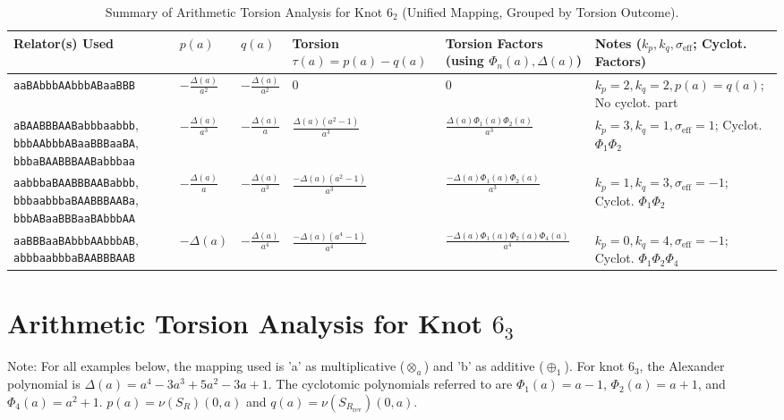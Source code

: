 \documentclass{article}
\begin{document}
\begin{table}[htbp]
\centering
\caption{Summary of Arithmetic Torsion Analysis for Knot $6_2$ (Unified Mapping, Grouped by Torsion Outcome).}
\label{tab:knot62_unified_mapping_new_data}
\scriptsize %
\begin{tabular}{@{}p{3.2cm} p{2.0cm} p{2.0cm} p{2.5cm} p{3.3cm} p{3.3cm}@{}}
\toprule
\textbf{Relator(s) Used} & \textbf{$p(a)$} & \textbf{$q(a)$} & \textbf{Torsion $\tau(a) = p(a) - q(a)$} & \textbf{Torsion Factors} (using $\Phi_n(a), \Delta(a)$) & \textbf{Notes} ($k_p, k_q, \sigma_{\text{eff}}$; Cyclot. Factors) \\
\midrule
\texttt{aaBAbbbAAbbbABaaBBB} & $-\frac{\Delta(a)}{a^2}$ & $-\frac{\Delta(a)}{a^2}$ & $0$ & $0$ & $k_p=2, k_q=2, p(a)=q(a)$; No cyclot. part \\
\addlinespace
\midrule
\texttt{aBAABBBAABabbbaabbb}, \texttt{bbbAAbbbABaaBBBaaBA}, \texttt{bbbaBAABBBAABabbbaa} & $-\frac{\Delta(a)}{a^3}$ & $-\frac{\Delta(a)}{a}$ & $\frac{\Delta(a)(a^2-1)}{a^3}$ & $\frac{\Delta(a)\Phi_1(a)\Phi_2(a)}{a^3}$ & $k_p=3, k_q=1, \sigma_{\text{eff}}=1$; Cyclot. $\Phi_1\Phi_2$ \\
\addlinespace
\midrule
\texttt{aabbbaBAABBBAABabbb}, \texttt{bbbaabbbaBAABBBAABa}, \texttt{bbbABaaBBBaaBAbbbAA} & $-\frac{\Delta(a)}{a}$ & $-\frac{\Delta(a)}{a^3}$ & $\frac{-\Delta(a)(a^2-1)}{a^3}$ & $\frac{-\Delta(a)\Phi_1(a)\Phi_2(a)}{a^3}$ & $k_p=1, k_q=3, \sigma_{\text{eff}}=-1$; Cyclot. $\Phi_1\Phi_2$ \\
\addlinespace
\midrule
\texttt{aaBBBaaBAbbbAAbbbAB}, \texttt{abbbaabbbaBAABBBAAB} & $-\Delta(a)$ & $-\frac{\Delta(a)}{a^4}$ & $\frac{-\Delta(a)(a^4-1)}{a^4}$ & $\frac{-\Delta(a)\Phi_1(a)\Phi_2(a)\Phi_4(a)}{a^4}$ & $k_p=0, k_q=4, \sigma_{\text{eff}}=-1$; Cyclot. $\Phi_1\Phi_2\Phi_4$ \\
\bottomrule
\end{tabular}
\end{table}
\vspace{1cm} %

\section*{Arithmetic Torsion Analysis for Knot $6_3$}

\noindent Note: For all examples below, the mapping used is 'a' as multiplicative ($\otimes_a$) and 'b' as additive ($\oplus_1$).
For knot $6_3$, the Alexander polynomial is $\Delta(a) = a^4 - 3a^3 + 5a^2 - 3a + 1$.
The cyclotomic polynomials referred to are $\Phi_1(a) = a-1$, $\Phi_2(a) = a+1$, and $\Phi_4(a) = a^2+1$.
$p(a) = \nu(S_R)(0,a)$ and $q(a) = \nu(S_{R_{\text{rev}}})(0,a)$.
\end{document}
